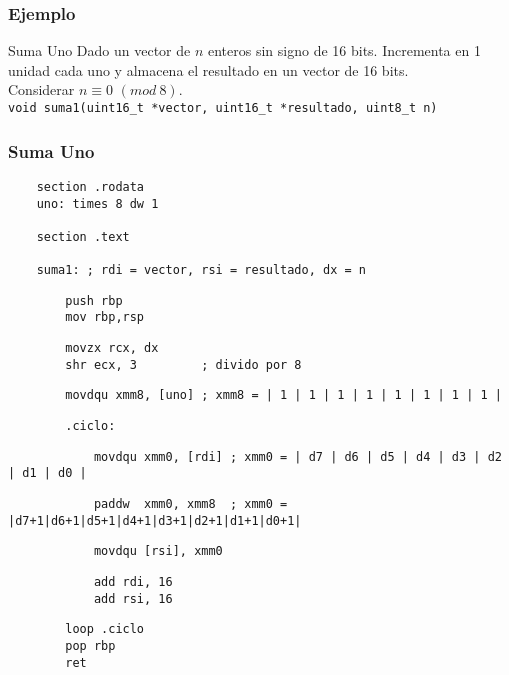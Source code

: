 \documentclass[aspectratio=169]{beamer}
\begin{document}
\begin{frame}[fragile]
    \frametitle{Ejemplo}
    \begin{block}{Suma Uno}
    Dado un vector de $n$ enteros sin signo de 16 bits. Incrementa en 1 unidad cada uno y almacena el resultado en un vector de 16 bits.\\
    Considerar $n \equiv 0$ $(mod\ 8)$.\\
    \bigskip
    \verb|void suma1(uint16_t *vector, uint16_t *resultado, uint8_t n)|
    \end{block}
\end{frame}

\begin{frame}[fragile]
    \frametitle{Suma Uno}
    \scriptsize
    \begin{verbatim}
    section .rodata
    uno: times 8 dw 1

    section .text

    suma1: ; rdi = vector, rsi = resultado, dx = n
    \end{verbatim}
    \vspace{-0.8cm} \pause
    \begin{verbatim}
        push rbp
        mov rbp,rsp
    \end{verbatim}
    \vspace{-0.8cm} \pause
    \begin{verbatim}
        movzx rcx, dx
        shr ecx, 3         ; divido por 8
    \end{verbatim}
    \vspace{-0.8cm} \pause
    \begin{verbatim}
        movdqu xmm8, [uno] ; xmm8 = | 1 | 1 | 1 | 1 | 1 | 1 | 1 | 1 |
    \end{verbatim}
    \vspace{-0.8cm} \pause
    \begin{verbatim}
        .ciclo:
    \end{verbatim}
    \vspace{-0.8cm} \pause
    \begin{verbatim}
            movdqu xmm0, [rdi] ; xmm0 = | d7 | d6 | d5 | d4 | d3 | d2 | d1 | d0 |
    \end{verbatim}
    \vspace{-0.8cm} \pause
    \begin{verbatim}
            paddw  xmm0, xmm8  ; xmm0 = |d7+1|d6+1|d5+1|d4+1|d3+1|d2+1|d1+1|d0+1|
    \end{verbatim}
    \vspace{-0.8cm} \pause
    \begin{verbatim}
            movdqu [rsi], xmm0
    \end{verbatim}
    \vspace{-0.8cm} \pause
    \begin{verbatim}
            add rdi, 16
            add rsi, 16
    \end{verbatim}
    \vspace{-0.8cm} \pause
    \begin{verbatim}
        loop .ciclo
        pop rbp
        ret 
    \end{verbatim}
\end{frame}
\end{document}
